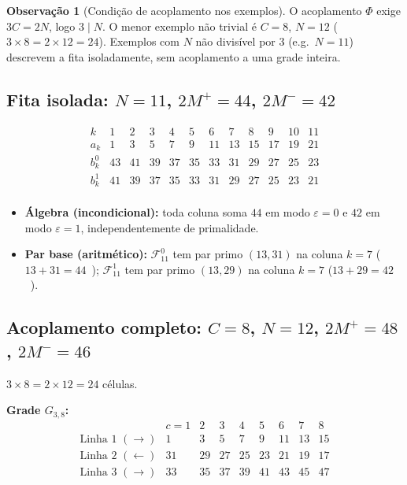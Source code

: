 \documentclass[12pt, a4paper]{article}
\theoremstyle{plain}
\theoremstyle{definition}
\newtheorem{remark}[theorem]{Observação}
\theoremstyle{remark}
\begin{document}
	\begin{remark}[Condição de acoplamento nos exemplos]
		O acoplamento $\Phi$ exige $3C=2N$, logo $3\mid N$.  O menor
		exemplo não trivial é $C=8$, $N=12$
		($3\times8=2\times12=24$).  Exemplos com $N$ não divisível por
		$3$ (e.g.\ $N=11$) descrevem a fita isoladamente, sem acoplamento
		a uma grade inteira.
	\end{remark}
	
	\subsection{Fita isolada: $N=11$, $2M^+=44$, $2M^-=42$}
	
	\[
	\begin{array}{c|ccccccccccc}
		k    & 1 & 2 & 3 & 4 & 5 & 6 & 7 & 8 & 9 & 10 & 11\\
		\hline
		a_k  & 1 & 3 & 5 & 7 & 9 &11 &13 &15 &17 &19  &21 \\
		b_k^0& 43&41 &39 &37 &35 &33 &31 &29 &27 &25  &23 \\
		b_k^1& 41&39 &37 &35 &33 &31 &29 &27 &25 &23  &21 \\
	\end{array}
	\]
	
	\begin{itemize}
		\item \textbf{Álgebra (incondicional):} toda coluna soma $44$
		em modo $\varepsilon=0$ e $42$ em modo $\varepsilon=1$,
		independentemente de primalidade.
		\item \textbf{Par base (aritmético):}
		$\mathcal{F}_{11}^0$ tem par primo $(13,31)$ na coluna
		$k=7$ ($13+31=44$~\checkmark);
		$\mathcal{F}_{11}^1$ tem par primo $(13,29)$ na coluna
		$k=7$ ($13+29=42$~\checkmark).
	\end{itemize}
	
	\subsection{Acoplamento completo: $C=8$, $N=12$, $2M^+=48$,
		$2M^-=46$}
	
	$3\times8=2\times12=24$ células. \checkmark
	
	\medskip\noindent\textbf{Grade $G_{3,8}$:}
	\[
	\begin{array}{c|cccccccc}
		& c=1&2&3&4&5&6&7&8\\
		\hline
		\text{Linha~1 }(\rightarrow) & 1&3&5&7&9&11&13&15\\
		\text{Linha~2 }(\leftarrow)  &31&29&27&25&23&21&19&17\\
		\text{Linha~3 }(\rightarrow) &33&35&37&39&41&43&45&47\\
	\end{array}
	\]
	
\end{document}
